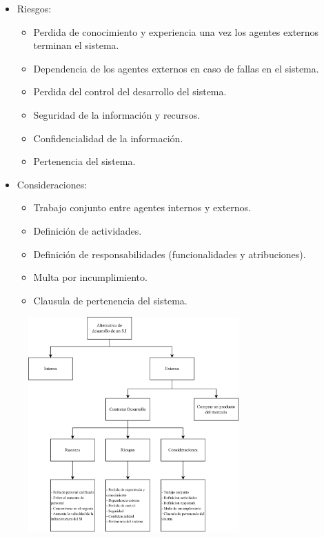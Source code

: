 \documentclass{templateNote}
\begin{document}
\begin{enumerate}
\begin{itemize}
\begin{itemize}
\begin{itemize}
            \end{itemize}
            \item Riesgos:
            \begin{itemize}
                \item Perdida de conocimiento y experiencia una vez los agentes externos terminan el sistema.
                \item Dependencia de los agentes externos en caso de fallas en el sistema.
                \item Perdida del control del desarrollo del sistema.
                \item Seguridad de la información y recursos.
                \item Confidencialidad de la información.
                \item Pertenencia del sistema.
            \end{itemize}
            \item Consideraciones:
            \begin{itemize}
                \item Trabajo conjunto entre agentes internos y externos.
                \item Definición de actividades.
                \item Definición de responsabilidades (funcionalidades y atribuciones).
                \item Multa por incumplimiento.
                \item Clausula de pertenencia del sistema.
            \end{itemize}
        \end{itemize}
    \end{itemize}
    \begin{figure}[H]
        \centering
        \includegraphics[width=0.72\textwidth]{img/Alt_des_SI.png}
    \end{figure}
\end{enumerate}
\end{document}
